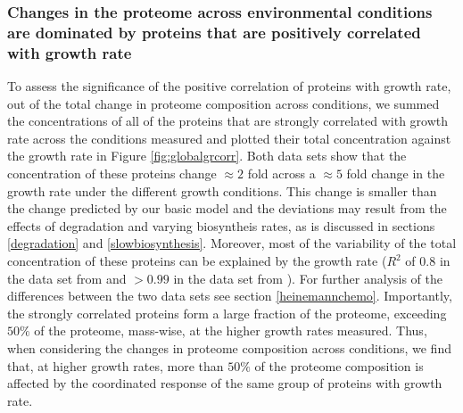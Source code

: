 \subsubsection{Changes in the proteome across environmental conditions are dominated by proteins that are positively correlated with growth rate}
To assess the significance of the positive correlation of proteins with growth rate, out of the total change in proteome composition across conditions, we summed the concentrations of all of the proteins that are strongly correlated with growth rate across the conditions measured and plotted their total concentration against the growth rate in Figure \ref{fig:globalgrcorr}.
Both data sets show that the concentration of these proteins change $\approx 2$ fold across a $\approx 5$ fold change in the growth rate under the different growth conditions.
This change is smaller than the change predicted by our basic model and the deviations may result from the effects of degradation and varying biosyntheis rates, as is discussed in sections \ref{degradation} and \ref{slowbiosynthesis}.
Moreover, most of the variability of the total concentration of these proteins can be explained by the growth rate ($R^2$ of $0.8$ in the data set from \cite{Heinemann2015} and $>0.99$ in the data set from \cite{Valgepea2013}). 
For further analysis of the differences between the two data sets see section \ref{heinemannchemo}.
Importantly, the strongly correlated proteins form a large fraction of the proteome, exceeding $50\%$ of the proteome, mass-wise, at the higher growth rates measured.
Thus, when considering the changes in proteome composition across conditions, we find that, at higher growth rates, more than $50\%$ of the proteome composition is affected by the coordinated response of the same group of proteins with growth rate.

